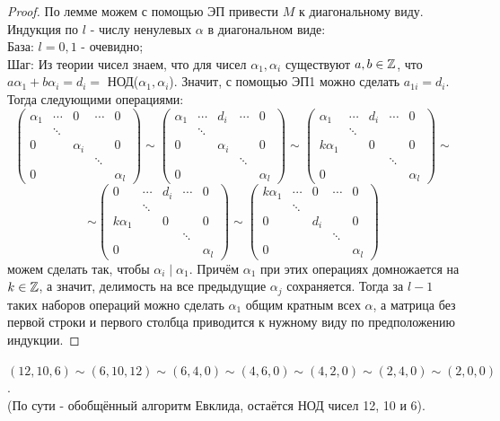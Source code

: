 \begin{proof}
    По лемме можем с помощью ЭП привести $M$ к диагональному виду. Индукция по $l$ - числу ненулевых $\alpha$ в диагональном виде:\\
    \tab База: $l = 0, 1$ - очевидно;\\
    \tab Шаг: Из теории чисел знаем, что для чисел $\alpha_1, \alpha_i$ существуют $a, b \in \mathbb{Z}$, что $a\alpha_1 + b\alpha_i = d_i =$ НОД($\alpha_1, \alpha_i$). Значит, с помощью ЭП1 можно сделать $a_{1i} = d_i$. Тогда следующими операциями:
    \[\begin{pmatrix}
    \alpha_1&\cdots&0&\cdots&0\\ &\ddots&&&\\ 0&&\alpha_i&&0\\ &&&\ddots&\\0&&&&\alpha_l
    \end{pmatrix} \sim \begin{pmatrix}
    \alpha_1&\cdots&d_i&\cdots&0\\ &\ddots&&&\\ 0&&\alpha_i&&0\\ &&&\ddots&\\0&&&&\alpha_l
    \end{pmatrix} \sim \begin{pmatrix}
    \alpha_1&\cdots&d_i&\cdots&0\\ &\ddots&&&\\ k\alpha_1&&0&&0\\ &&&\ddots&\\0&&&&\alpha_l
    \end{pmatrix} \sim\]
    \[\sim \begin{pmatrix}
    0&\cdots&d_i&\cdots&0\\ &\ddots&&&\\ k\alpha_1&&0&&0\\ &&&\ddots&\\0&&&&\alpha_l
    \end{pmatrix} \sim \begin{pmatrix}
    k\alpha_1&\cdots&0&\cdots&0\\ &\ddots&&&\\ 0&&d_i&&0\\ &&&\ddots&\\0&&&&\alpha_l
    \end{pmatrix}\]
    можем сделать так, чтобы $\alpha_i \mid \alpha_1$. Причём $\alpha_1$ при этих операциях домножается на $k \in \mathbb{Z}$, а значит, делимость на все предыдущие $\alpha_j$ сохраняется. Тогда за $l-1$ таких наборов операций можно сделать $\alpha_1$ общим кратным всех $\alpha$, а матрица без первой строки и первого столбца приводится к нужному виду по предположению индукции.
\end{proof}
\begin{example}
    $(12, 10, 6) \sim (6, 10, 12) \sim (6, 4, 0) \sim (4, 6, 0) \sim (4, 2, 0) \sim (2, 4, 0) \sim (2, 0, 0)$.\\
    (По сути - обобщённый алгоритм Евклида, остаётся НОД чисел 12, 10 и 6).
\end{example}
\setcounter{thcount}{0}

